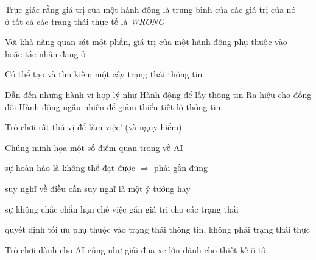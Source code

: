 \documentclass{article}
\begin{document}
\begin{huge}

\mat{*} Trực giác rằng giá trị của một hành động là trung bình của các giá trị của nó\\
ở tất cả các trạng thái thực tế là \emph{WRONG}

Với khả năng quan sát một phần, giá trị của một hành động phụ thuộc vào \\
 hoặc  tác nhân đang ở

Có thể tạo và tìm kiếm một cây trạng thái thông tin

Dẫn đến những hành vi hợp lý như \al
\blob Hành động để lấy thông tin\al
\blob Ra hiệu cho đồng đội\al
\blob Hành động ngẫu nhiên để giảm thiểu tiết lộ thông tin




Trò chơi rất thú vị để làm việc! (và nguy hiểm)

Chúng minh họa một số điểm quan trọng về AI

\blob sự hoàn hảo là không thể đạt được $\Rightarrow$ phải gần đúng

\blob suy nghĩ về điều cần suy nghĩ là một ý tưởng hay

\blob sự không chắc chắn hạn chế việc gán giá trị cho các trạng thái

\blob quyết định tối ưu phụ thuộc vào trạng thái thông tin, không phải trạng thái thực

Trò chơi dành cho AI cũng như giải đua xe lớn dành cho thiết kế ô tô



\end{huge}
\end{document}
